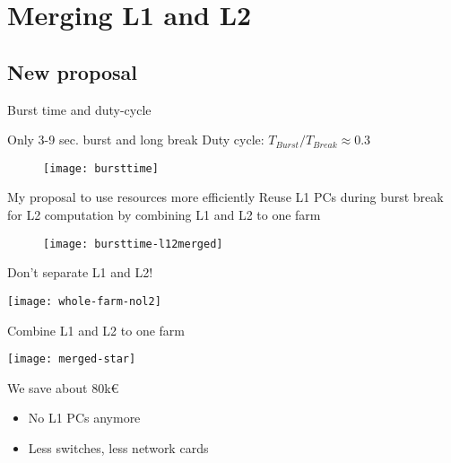 \section{Merging L1 and L2}

\subsection{New proposal}
\begin{frame}{Burst time and duty-cycle}{}
	\begin{block}{Only 3-9 sec. burst and long break}
		Duty cycle: $T_{Burst}/ T_{Break} \approx 0.3$
	\end{block}

	\begin{figure}[htp]
		\begin{center}
		  \texttt{[image: bursttime]}
		\end{center}
	\end{figure}
	
	\begin{exampleblock}{My proposal to use resources more efficiently}
		Reuse L1 PCs during burst break for L2 computation by combining L1 and L2 to
		one farm
	\end{exampleblock}

	\begin{figure}[htp]
		\begin{center}
		 \texttt{[image: bursttime-l12merged]}
		\end{center}
	\end{figure}
\end{frame}

\begin{frame}{Don't separate L1 and L2!}{}
	\begin{center} 
		\texttt{[image: whole-farm-nol2]}
	\end{center} 
\end{frame}

\begin{frame}{Combine L1 and L2 to one farm}{}
	\begin{center} 
		\texttt{[image: merged-star]}
	\end{center} 
	\begin{exampleblock}{We save about 80k€}
		\begin{itemize}
		  \item No L1 PCs anymore
		  \item Less switches, less network cards
		\end{itemize}
	\end{exampleblock}
\end{frame}


